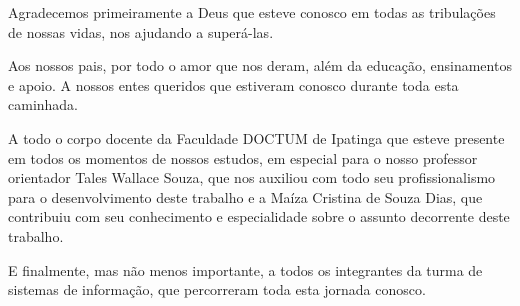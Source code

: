 \begin{agradecimentos}[AGRADECIMENTOS]
Agradecemos primeiramente a Deus que esteve conosco em todas as tribulações de nossas vidas, nos ajudando a superá-las.

Aos nossos pais, por todo o amor que nos deram, além da educação, ensinamentos e apoio. A nossos entes queridos que estiveram conosco durante toda esta caminhada.

A todo o corpo docente da Faculdade DOCTUM de Ipatinga que esteve presente em todos os momentos de nossos estudos, em especial para o nosso professor orientador Tales Wallace Souza, que nos auxiliou com todo seu profissionalismo para o desenvolvimento deste trabalho e a Maíza Cristina de Souza Dias, que contribuiu com seu conhecimento e especialidade sobre o assunto decorrente deste trabalho.

E finalmente, mas não menos importante, a todos os integrantes da turma de sistemas de informação, que percorreram toda esta jornada conosco.
\end{agradecimentos}